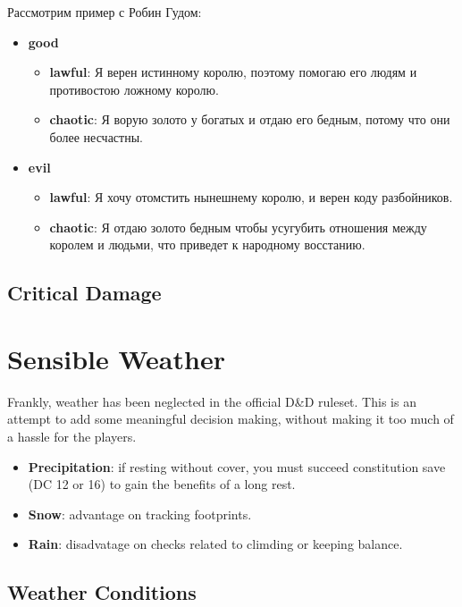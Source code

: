 \documentclass[a4paper,11pt]{book}
\begin{document}
\begin{multicols}{2}
Рассмотрим пример с Робин Гудом:

\begin{itemize}
    \item \textbf{good}
    \begin{itemize}
        \item \textbf{lawful}: Я верен истинному королю, поэтому помогаю его людям и противостою ложному королю.
        \item \textbf{chaotic}: Я ворую золото у богатых и отдаю его бедным, потому что они более несчастны.
    \end{itemize}
    \item \textbf{evil}
    \begin{itemize}
        \item \textbf{lawful}: Я хочу отомстить нынешнему королю, и верен коду разбойников.
        \item \textbf{chaotic}: Я отдаю золото бедным чтобы усугубить отношения между королем и людьми, что приведет к народному восстанию.
    \end{itemize}
\end{itemize}


\section{Critical Damage}

\chapter{Sensible Weather}

Frankly, weather has been neglected in the official D\&D ruleset. This is an attempt to add some meaningful decision making, without making it too much of a hassle for the players.

\begin{itemize}
    \item \textbf{Precipitation}: if resting without cover, you must succeed constitution save (DC 12 or 16) to gain the benefits of a long rest.
    \item \textbf{Snow}: advantage on tracking footprints.
    \item \textbf{Rain}: disadvatage on checks related to climding or keeping balance.
\end{itemize}

\section{Weather Conditions}


\end{multicols}
\end{document}
